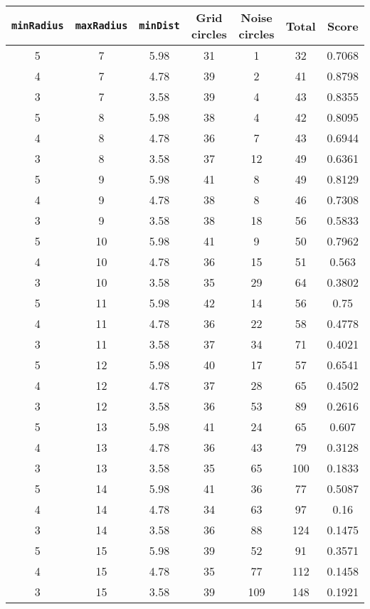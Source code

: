 \documentclass[letterpaper, 12pt]{article}
\begin{document}
\begin{longtable}{|c|c|c|c|c|c|c|}
\hline
\textbf{\texttt{minRadius}} & \textbf{\texttt{maxRadius}} & \textbf{\texttt{minDist}} & \textbf{Grid circles} & \textbf{Noise circles} & \textbf{Total} & \textbf{Score} \\
\hline
5 & 7 & 5.98 & 31 & 1 & 32 & 0.7068 \\
\hline
4 & 7 & 4.78 & 39 & 2 & 41 & 0.8798 \\
\hline
3 & 7 & 3.58 & 39 & 4 & 43 & 0.8355 \\
\hline
5 & 8 & 5.98 & 38 & 4 & 42 & 0.8095 \\
\hline
4 & 8 & 4.78 & 36 & 7 & 43 & 0.6944 \\
\hline
3 & 8 & 3.58 & 37 & 12 & 49 & 0.6361 \\
\hline
5 & 9 & 5.98 & 41 & 8 & 49 & 0.8129 \\
\hline
4 & 9 & 4.78 & 38 & 8 & 46 & 0.7308 \\
\hline
3 & 9 & 3.58 & 38 & 18 & 56 & 0.5833 \\
\hline
5 & 10 & 5.98 & 41 & 9 & 50 & 0.7962 \\
\hline
4 & 10 & 4.78 & 36 & 15 & 51 & 0.563 \\
\hline
3 & 10 & 3.58 & 35 & 29 & 64 & 0.3802 \\
\hline
5 & 11 & 5.98 & 42 & 14 & 56 & 0.75 \\
\hline
4 & 11 & 4.78 & 36 & 22 & 58 & 0.4778 \\
\hline
3 & 11 & 3.58 & 37 & 34 & 71 & 0.4021 \\
\hline
5 & 12 & 5.98 & 40 & 17 & 57 & 0.6541 \\
\hline
4 & 12 & 4.78 & 37 & 28 & 65 & 0.4502 \\
\hline
3 & 12 & 3.58 & 36 & 53 & 89 & 0.2616 \\
\hline
5 & 13 & 5.98 & 41 & 24 & 65 & 0.607 \\
\hline
4 & 13 & 4.78 & 36 & 43 & 79 & 0.3128 \\
\hline
3 & 13 & 3.58 & 35 & 65 & 100 & 0.1833 \\
\hline
5 & 14 & 5.98 & 41 & 36 & 77 & 0.5087 \\
\hline
4 & 14 & 4.78 & 34 & 63 & 97 & 0.16 \\
\hline
3 & 14 & 3.58 & 36 & 88 & 124 & 0.1475 \\
\hline
5 & 15 & 5.98 & 39 & 52 & 91 & 0.3571 \\
\hline
4 & 15 & 4.78 & 35 & 77 & 112 & 0.1458 \\
\hline
3 & 15 & 3.58 & 39 & 109 & 148 & 0.1921 \\

\end{longtable}
\end{document}
